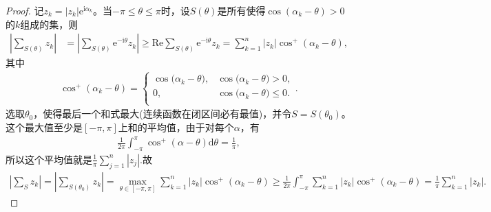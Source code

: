\documentclass[../../main.tex]{subfiles}%
\begin{document}
\begin{proof}
记$z_k = |z_k| \mathrm{e}^{\mathrm{i}\alpha_k}$。当$-\pi \leqslant \theta \leqslant \pi$时，设$S(\theta)$是所有使得$\cos(\alpha_k - \theta) > 0$的$k$组成的集，则
\begin{align*}
\left| \sum_{S(\theta)} z_k \right| &= \left| \sum_{S(\theta)} \mathrm{e}^{-\mathrm{i}\theta} z_k \right| \geqslant \mathrm{Re}\sum_{S(\theta)} \mathrm{e}^{-\mathrm{i}\theta} z_k = \sum_{k=1}^{n} |z_k| \cos^+(\alpha_k - \theta),
\end{align*}
其中
\begin{align*}
\cos ^+(\alpha _k-\theta )=\begin{cases}
\cos\mathrm{(}\alpha _k-\theta ),&\cos\mathrm{(}\alpha _k-\theta )>0,\\
0,&\cos\mathrm{(}\alpha _k-\theta )\leqslant 0.\\
\end{cases}.
\end{align*}
选取$\theta_0$，使得最后一个和式最大(连续函数在闭区间必有最值)，并令$S = S(\theta_0)$。这个最大值至少是$[-\pi, \pi]$上和的平均值，由于对每个$\alpha$，有
\begin{align*}
\frac{1}{2\pi} \int_{-\pi}^{\pi} \cos^+(\alpha - \theta) \mathrm{d}\theta = \frac{1}{\pi},
\end{align*}
所以这个平均值就是$\frac{1}{\pi} \sum_{j=1}^{n} |z_j|.$故
\begin{align*}
\left| \sum_S{z_k} \right|=\left| \sum_{S(\theta _0)}{z_k} \right|=\underset{\theta \in \left[ -\pi ,\pi \right]}{\max}\sum_{k=1}^n{|z_k|\cos ^+(\alpha _k-\theta )}\geqslant \frac{1}{2\pi}\int_{-\pi}^{\pi}{\sum_{k=1}^n{|z_k|\cos ^+(\alpha _k-\theta )}}=\frac{1}{\pi}\sum_{k=1}^n{|z_k|}.
\end{align*}

\end{proof}
\end{document}
